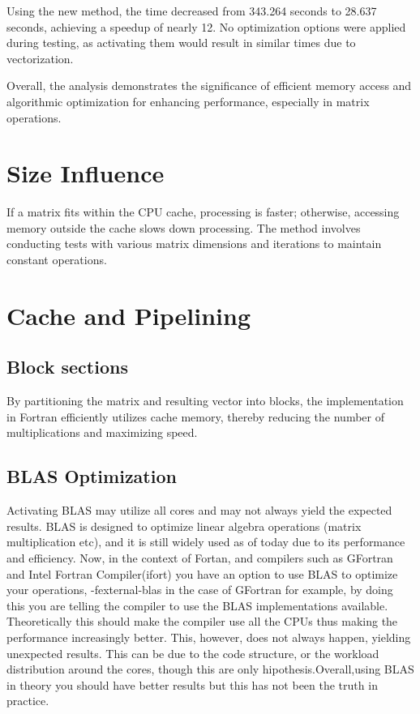 \documentclass{article}
\begin{document}
        Using the new method, the time decreased from 343.264 seconds to 28.637 seconds, achieving a speedup of nearly 12. No optimization options were applied during testing, as activating them would result in similar times due to vectorization.

        Overall, the analysis demonstrates the significance of efficient memory access and algorithmic optimization for enhancing performance, especially in matrix operations.
\section*{Size Influence}
If a matrix fits within the CPU cache, processing is faster; otherwise, accessing memory outside the cache slows down processing. The method involves conducting tests with various matrix dimensions and iterations to maintain constant operations.
\section*{Cache and Pipelining}
\subsection*{Block sections}
By partitioning the matrix and resulting vector into blocks, the implementation in Fortran efficiently utilizes cache memory, thereby reducing the number of multiplications and maximizing speed. 
\subsection*{BLAS Optimization}
Activating BLAS may utilize all cores and may not always yield the expected results. BLAS is designed to optimize linear algebra operations (matrix multiplication etc), and it is still widely used as of today due to its performance and efficiency. Now, in the context of Fortan, and compilers such as GFortran and Intel Fortran Compiler(ifort) you have an option to use BLAS to optimize your operations,
-fexternal-blas in the case of GFortran for example, by doing this you are telling the compiler to use the BLAS implementations available. Theoretically this should make the compiler use all the CPUs thus making the performance increasingly better. This, however, does not always happen, yielding unexpected results. This can be due to the code structure, or the workload distribution around the cores, though this are only hipothesis.Overall,using BLAS in theory you should have better results but this has not been the truth in practice.
\end{document}
